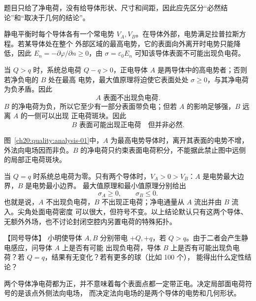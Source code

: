 {\begin{xesolution}
题目只给了净电荷，没有给导体形状、尺寸和间距，因此应先区分“必然结论”和“取决于几何的结论”。

静电平衡时每个导体各有一个常电势 $V_A,V_B$。在导体外部，电势满足拉普拉斯方程。若某导体处在整个
外部区域的最高电势，它的表面向外离开时电势只能降低，因此
$E_n=-\partial\varphi/\partial n\ge0$，由 $\sigma=\varepsilon_0E_n$ 可知该导体表面不可能出现负电荷。

当 $Q>q$ 时，系统总电荷 $Q-q>0$，正电导体 $A$ 是两导体中的高电势者；否则若净负电的 $B$ 处在最高
电势，最大值原理将迫使它表面处处 $\sigma\ge0$，与其净电荷为负矛盾。因此
\[
  \boxed{A\text{ 表面不出现负电荷}}.
\]
$B$ 的净电荷为负，所以它至少有一部分表面带负电；但若 $A$ 的影响足够强，$B$ 远离 $A$ 的一侧可以出现
正电荷斑块。因此
\[
  \boxed{B\text{ 表面可能出现正电荷}\quad\text{但并非必然}}.
\]

\begin{qualityfigure}
\twoConductorPatchFigure
{}\label{ch20:quality:analysis-01}
\end{qualityfigure}
图~\ref{ch20:quality:analysis-01}中，$A$ 为最高电势导体时，离开其表面的电势不增，外法向电场因而非负。$B$ 的净电荷只约束表面电荷积分，不能据此禁止图中远侧的局部正电荷斑块。

当 $Q=q$ 时系统总电荷为零。只有两个导体时，$V_A>0>V_B$：$A$ 是电势最大边界，$B$ 是电势最小边界。
最大值原理和最小值原理分别给出
\[
  \boxed{\sigma_A\ge0,\qquad \sigma_B\le0}.
\]
也就是说，$A$ 不出现负电荷，$B$ 不出现正电荷；净电通量从 $A$ 流出并由 $B$ 流入。尖角处面电荷密度
可以很大，但符号不变。以上结论默认只有这两个导体、无额外外场，也不讨论封闭空腔内另置电荷的特殊拓扑。
\end{xesolution}



\begin{origexamplebox}{【同号导体】}\label{ch20:ex:s34-3-2}
小明使导体 $A,B$ 分别带电 $+Q,+q$，若 $Q>q$。由于二者会产生静电感应，问导体 $A$ 上是否有可能
出现负电荷，导体 $B$ 上是否有可能出现负电荷？若 $Q=q$，结果有无变化？若有更多的球（比如 100 个），
能得出什么定性结论？

\ThQPositiveConductors
\end{origexamplebox}\par\nopagebreak[4]

\begin{xesolution}
\ThAPositiveConductors

两个导体净电荷都为正，并不意味着每个表面点都一定带正电。决定局部面电荷符号的是该点外侧法向电场，
而决定法向电场的是两个导体的电势和几何形状。


\end{xesolution}}
